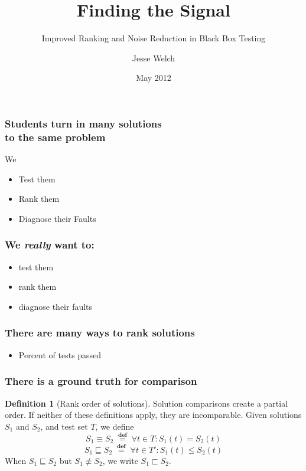 \documentclass[svgnames,14pt]{beamer}
\title{Finding the Signal}
\subtitle{Improved Ranking and Noise Reduction in Black Box Testing}
\author{Jesse Welch}
\date{May 2012}
\newcommand\defined{\mathrel{\;\stackrel{\scriptscriptstyle\mathbf{def}}{=}\;}}
\theoremstyle{definition}
\newtheorem{defn}{Definition}
\begin{document}
\begin{frame}
\maketitle
\end{frame}

\begin{frame}
\frametitle{Students turn in many solutions \\ to the same problem}
We 
\begin{itemize}
\item Test them \uncover<2->{\textbf{cheaply}}
\item Rank them 
\item Diagnose their Faults 
\end{itemize}
\end{frame}

\begin{frame}
\frametitle{We \emph{really} want to:}
\begin{itemize}
\item {}test them
\item {}rank them
\item {}diagnose their faults
\end{itemize}
\end{frame}

\begin{frame}
\frametitle{There are many ways to rank solutions}
\begin{itemize}
\item Percent of tests passed
\end{itemize}
\end{frame}

\begin{frame}
\frametitle{There is a ground truth for comparison}
\begin{defn}[Rank order of solutions]
Solution comparisons create a partial order. If neither of these definitions apply, they are incomparable.
Given solutions $S_1$ and $S_2$, and test set $T$, we define
$$S_1 \equiv S_2 \defined \forall t \in T : S_1(t) = S_2(t)$$
$$S_1 \sqsubseteq S_2 \defined \forall t \in T' : S_1(t) \leq S_2(t)$$
When $S_1 \sqsubseteq S_2$ but $S_1 \not\equiv S_2$, we write
$S_1 \sqsubset S_2$.
\end{defn}
\end{frame}
\end{document}
